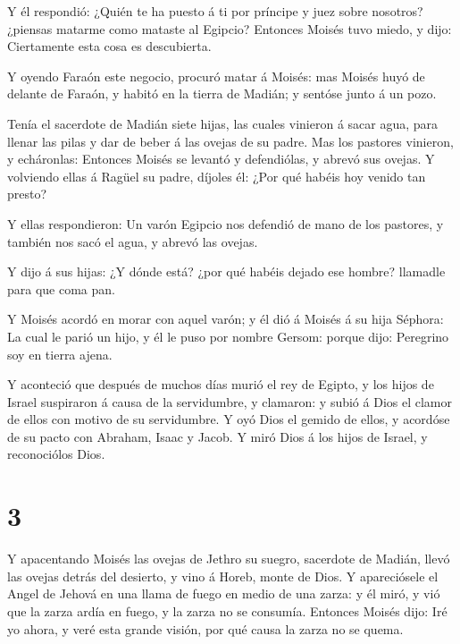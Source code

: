  Y él respondió: ¿Quién te ha puesto á ti por príncipe y
juez sobre nosotros? ¿piensas matarme como mataste al Egipcio? Entonces
Moisés tuvo miedo, y dijo: Ciertamente esta cosa es descubierta.

 Y oyendo Faraón este negocio, procuró matar á Moisés: mas
Moisés huyó de delante de Faraón, y habitó en la tierra de Madián; y
sentóse junto á un pozo.

 Tenía el sacerdote de Madián siete hijas, las cuales
vinieron á sacar agua, para llenar las pilas y dar de beber á las ovejas
de su padre.  Mas los pastores vinieron, y echáronlas:
Entonces Moisés se levantó y defendiólas, y abrevó sus ovejas.
 Y volviendo ellas á Ragüel su padre, díjoles él: ¿Por qué
habéis hoy venido tan presto?

 Y ellas respondieron: Un varón Egipcio nos defendió de
mano de los pastores, y también nos sacó el agua, y abrevó las ovejas.

 Y dijo á sus hijas: ¿Y dónde está? ¿por qué habéis dejado
ese hombre? llamadle para que coma pan.

 Y Moisés acordó en morar con aquel varón; y él dió á
Moisés á su hija Séphora:  La cual le parió un hijo, y él
le puso por nombre Gersom: porque dijo: Peregrino soy en tierra ajena.

 Y aconteció que después de muchos días murió el rey de
Egipto, y los hijos de Israel suspiraron á causa de la servidumbre, y
clamaron: y subió á Dios el clamor de ellos con motivo de su
servidumbre.  Y oyó Dios el gemido de ellos, y acordóse de
su pacto con Abraham, Isaac y Jacob.  Y miró Dios á los
hijos de Israel, y reconociólos Dios.

\hypertarget{section-2}{%
\section{3}\label{section-2}}

 Y apacentando Moisés las ovejas de Jethro su suegro,
sacerdote de Madián, llevó las ovejas detrás del desierto, y vino á
Horeb, monte de Dios.  Y apareciósele el Angel de Jehová en
una llama de fuego en medio de una zarza: y él miró, y vió que la zarza
ardía en fuego, y la zarza no se consumía.  Entonces Moisés
dijo: Iré yo ahora, y veré esta grande visión, por qué causa la zarza no
se quema.

